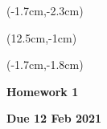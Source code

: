 \documentclass[12pt, oneside]{article}
\begin{document}
\begin{textblock*}{4cm}(-1.7cm,-2.3cm)
\end{textblock*}

\begin{textblock*}{8cm}(12.5cm,-1cm)
\end{textblock*}
\begin{textblock*}{13.5cm}(-1.7cm,-1.8cm)
\end{textblock*}

\vspace{1cm}

\begin{center}
\textbf{\Large Homework 1}

\textbf{Due 12 Feb 2021}
\end{center}
\end{document}
